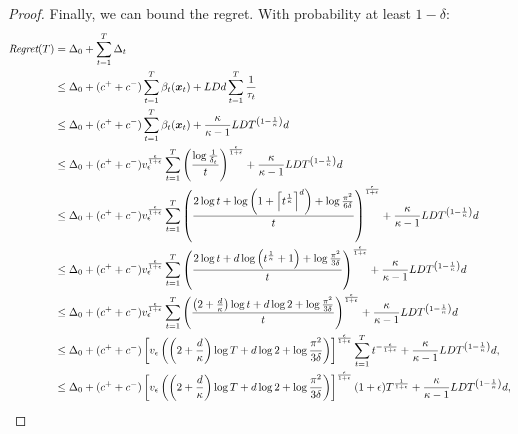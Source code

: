 \documentclass{article}
\begin{document}
\begin{proof}
	Finally, we can bound the regret. With probability at least $1-\delta$:
	\begin{align}
		\textit{Regret}(T) &= \Delta_0 + \sum_{t=1}^{T}\Delta_t \nonumber\\
		&\leq \Delta_0 +(c^{+}+c^{-})\sum_{t=1}^{T}\beta_t(\boldsymbol{x}_t) + LDd\sum_{t=1}^{T}\frac{1}{\tau_t} \label{pp:25}\\
		&\leq \Delta_0 +(c^{+}+c^{-})\sum_{t=1}^{T}\beta_t(\boldsymbol{x}_t) + \frac{\kappa }{\kappa-1}LDT^{\left(1-\frac{1}{\kappa}\right)}d\label{pp:26}\\
		&\leq \Delta_0 + (c^{+}+c^{-})v_{\epsilon}^{\frac{\epsilon}{1+\epsilon}}\sum_{t=1}^{T}\left(\frac{\log\frac{1}{\delta_t}}{t}\right)^{\frac{\epsilon}{1+\epsilon}} + \frac{\kappa }{\kappa-1}LDT^{\left(1-\frac{1}{\kappa}\right)}d\label{pp:27}\\
		&\leq \Delta_0 + (c^{+}+c^{-})v_{\epsilon}^{\frac{\epsilon}{1+\epsilon}}\sum_{t=1}^{T}\left(\frac{
			2\log t + \log\left(1+\left\lceil t^{\frac{1}{\kappa}}\right\rceil^d\right) + \log\frac{\pi^2}{6\delta}
		}{t}\right)^{\frac{\epsilon}{1+\epsilon}} + \frac{\kappa }{\kappa-1}LDT^{\left(1-\frac{1}{\kappa}\right)}d\label{pp:28}\\
		&\leq \Delta_0 + (c^{+}+c^{-})v_{\epsilon}^{\frac{\epsilon}{1+\epsilon}}\sum_{t=1}^{T}\left(\frac{
		2\log t + d\log \left(t^{\frac{1}{\kappa}}+1\right) + \log\frac{\pi^2}{3\delta}
		}{t}\right)^{\frac{\epsilon}{1+\epsilon}} + \frac{\kappa }{\kappa-1}LDT^{\left(1-\frac{1}{\kappa}\right)}d\label{pp:29}\\
		&\leq \Delta_0 + (c^{+}+c^{-})v_{\epsilon}^{\frac{\epsilon}{1+\epsilon}}\sum_{t=1}^{T}\left(\frac{
		\left(2+ \frac{d}{\kappa}\right)\log t + d\log 2 + \log\frac{\pi^2}{3\delta}
		}{t}\right)^{\frac{\epsilon}{1+\epsilon}} + \frac{\kappa }{\kappa-1}LDT^{\left(1-\frac{1}{\kappa}\right)}d\label{pp:30}\\
		&\leq \Delta_0 + (c^{+}+c^{-})\left[v_{\epsilon}
		\left(
		\left(2+ \frac{d}{\kappa}\right)\log T + d\log 2 + \log\frac{\pi^2}{3\delta}
		\right)\right]^{\frac{\epsilon}{1+\epsilon}}\sum_{t=1}^{T}t^{-\frac{\epsilon}{1+\epsilon}} + \frac{\kappa }{\kappa-1}LDT^{\left(1-\frac{1}{\kappa}\right)}d, \nonumber\\
		&\leq \Delta_0 + (c^{+}+c^{-})\left[v_{\epsilon}
		\left(
		\left(2+ \frac{d}{\kappa}\right)\log T + d\log 2 + \log\frac{\pi^2}{3\delta}
		\right)\right]^{\frac{\epsilon}{1+\epsilon}}(1+\epsilon)T^{\frac{1}{1+\epsilon}} + \frac{\kappa }{\kappa-1}LDT^{\left(1-\frac{1}{\kappa}\right)}d, \nonumber\\
	\end{align}

\end{proof}
\end{document}
